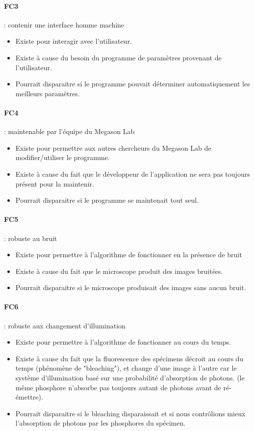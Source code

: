 \paragraph*{FC3} : contenir une interface homme machine
\begin{itemize}
  \item Existe pour interagir avec l'utilisateur.
  \item Existe à cause du besoin du programme de paramètres provenant de l'utilisateur.
  \item Pourrait disparaitre si le programme pouvait déterminer automatiquement les meilleurs paramètres.
\end{itemize}

\paragraph*{FC4} : maintenable par l'équipe du Megason Lab
\begin{itemize}
  \item Existe pour permettre aux autres chercheurs du Megason Lab de modifier/utiliser le programme.
  \item Existe à cause du fait que le développeur de l'application ne sera pas toujours présent pour la maintenir.
  \item Pourrait disparaitre si le programme se maintenait tout seul.
\end{itemize}

\paragraph*{FC5} : robuste au bruit
\begin{itemize}
  \item Existe pour permettre à l'algorithme de fonctionner en la présence de bruit
  \item Existe à cause du fait que le microscope produit des images bruitées.
  \item Pourrait disparaitre si le microscope produisait des images sans aucun bruit.
\end{itemize}


\paragraph*{FC6} : robuste aux changement d'illumination
\begin{itemize}
  \item Existe pour permettre à l'algorithme de fonctionner au cours du temps. 
  \item Existe à cause du fait que la fluorescence des spécimens décroit au cours du temps (phénomène de "bleaching"),
  et change d'une image à l'autre car le système d'illumination basé sur une probabilité d'absorption de photons.
  (le même phosphore n'absorbe pas toujours autant de photons avant de ré-émettre).
  \item Pourrait disparaitre si le bleaching disparaissait 
  et si nous contrôlions mieux l'absorption de photons par les phosphores du spécimen.
\end{itemize}

